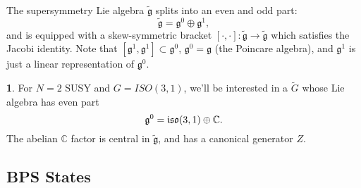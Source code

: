 \documentclass[oneside,english]{amsbook}
\numberwithin{section}{chapter}
\numberwithin{equation}{section}
\numberwithin{figure}{section}
\theoremstyle{plain}
\theoremstyle{definition}
\theoremstyle{remark}
\theoremstyle{definition}
\newtheorem*{example*}{\protect\examplename}
\theoremstyle{definition}
\theoremstyle{plain}
\providecommand{\examplename}{Example}
\begin{document}
The supersymmetry Lie algebra $\tilde{\mathfrak{g}}$ splits into
an even and odd part: 
\[
\tilde{\mathfrak{g}}=\mathfrak{g}^{0}\oplus\mathfrak{g}^{1},
\]
and is equipped with a skew-symmetric bracket $\left[\cdot,\cdot\right]:\tilde{\mathfrak{g}}\rightarrow\tilde{\mathfrak{g}}$
which satisfies the Jacobi identity. Note that $\left[\mathfrak{g}^{1},\mathfrak{g}^{1}\right]\subset\mathfrak{g}^{0}$,
$\mathfrak{g}^{0}=\mathfrak{g}$ (the Poincare algebra), and $\mathfrak{g}^{1}$
is just a linear representation of $\mathfrak{g}^{0}$. 
\begin{example*}
For $N=2$ SUSY and $G=ISO(3,1)$, we'll be interested in a $\tilde{G}$
whose Lie algebra has even part 
\[
\mathfrak{g}^{0}=\mbox{\ensuremath{\mathfrak{iso}}}(3,1)\oplus\mathbb{C}.
\]
The abelian $\mathbb{C}$ factor is central in $\tilde{\mathfrak{g}}$,
and has a canonical generator $Z$. 
\end{example*}

\subsection{BPS States}
\end{document}
